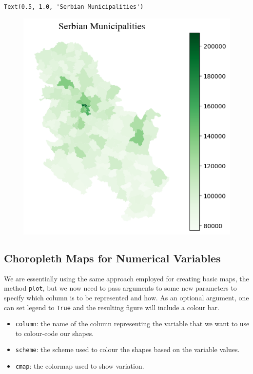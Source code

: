 \documentclass[
  letterpaper,
  DIV=11,
  numbers=noendperiod]{scrreprt}
\providecommand{\tightlist}{%
  \setlength{\itemsep}{0pt}\setlength{\parskip}{0pt}}\usepackage{longtable,booktabs,array}
\begin{document}
\begin{verbatim}
Text(0.5, 1.0, 'Serbian Municipalities')
\end{verbatim}

\begin{figure}[H]

{\centering \includegraphics{labs/w02_maps_files/figure-pdf/cell-28-output-2.png}

}

\end{figure}

\hypertarget{choropleth-maps-for-numerical-variables}{%
\subsection{Choropleth Maps for Numerical
Variables}\label{choropleth-maps-for-numerical-variables}}

We are essentially using the same approach employed for creating basic
maps, the method \texttt{plot}, but we now need to pass arguments to
some new parameters to specify which column is to be represented and
how. As an optional argument, one can set legend to \texttt{True} and
the resulting figure will include a colour bar.

\begin{itemize}
\tightlist
\item
  \texttt{column}: the name of the column representing the variable that
  we want to use to colour-code our shapes.
\item
  \texttt{scheme}: the scheme used to colour the shapes based on the
  variable values.
\item
  \texttt{cmap}: the colormap used to show variation.
\end{itemize}
\end{document}

